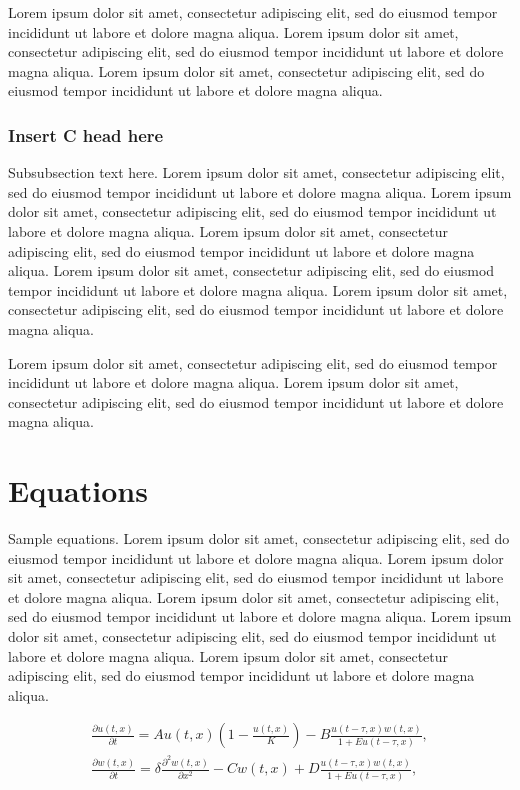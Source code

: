 \documentclass[
  journal=large,
  manuscript=article-type,
  year=2020,
  volume=37,
]{cup-journal}
\begin{document}
 Lorem ipsum dolor sit amet, consectetur adipiscing elit, sed do eiusmod tempor incididunt ut labore et dolore magna aliqua. Lorem ipsum dolor sit amet, consectetur adipiscing elit, sed do eiusmod tempor incididunt ut labore et dolore magna aliqua. Lorem ipsum dolor sit amet, consectetur adipiscing elit, sed do eiusmod tempor incididunt ut labore et dolore magna aliqua. 

\subsubsection{Insert C head here}
Subsubsection text here. Lorem ipsum dolor sit amet, consectetur adipiscing elit, sed do eiusmod tempor incididunt ut labore et dolore magna aliqua. Lorem ipsum dolor sit amet, consectetur adipiscing elit, sed do eiusmod tempor incididunt ut labore et dolore magna aliqua. Lorem ipsum dolor sit amet, consectetur adipiscing elit, sed do eiusmod tempor incididunt ut labore et dolore magna aliqua. Lorem ipsum dolor sit amet, consectetur adipiscing elit, sed do eiusmod tempor incididunt ut labore et dolore magna aliqua. Lorem ipsum dolor sit amet, consectetur adipiscing elit, sed do eiusmod tempor incididunt ut labore et dolore magna aliqua. 

Lorem ipsum dolor sit amet, consectetur adipiscing elit, sed do eiusmod tempor incididunt ut labore et dolore magna aliqua. Lorem ipsum dolor sit amet, consectetur adipiscing elit, sed do eiusmod tempor incididunt ut labore et dolore magna aliqua. 

\section{Equations}

Sample equations. Lorem ipsum dolor sit amet, consectetur adipiscing elit, sed do eiusmod tempor incididunt ut labore et dolore magna aliqua. Lorem ipsum dolor sit amet, consectetur adipiscing elit, sed do eiusmod tempor incididunt ut labore et dolore magna aliqua. Lorem ipsum dolor sit amet, consectetur adipiscing elit, sed do eiusmod tempor incididunt ut labore et dolore magna aliqua. Lorem ipsum dolor sit amet, consectetur adipiscing elit, sed do eiusmod tempor incididunt ut labore et dolore magna aliqua. Lorem ipsum dolor sit amet, consectetur adipiscing elit, sed do eiusmod tempor incididunt ut labore et dolore magna aliqua. 


\begin{equation}
\begin{aligned}\label{eq:first}
\frac{\partial u(t,x)}{\partial t} = Au(t,x) \left(1-\frac{u(t,x)}{K}\right)
 -B\frac{u(t-\tau,x) w(t,x)}{1+Eu(t-\tau,x)},\\
\frac{\partial w(t,x)}{\partial t} =\delta \frac{\partial^2w(t,x)}{\partial x^2}-Cw(t,x)
+D\frac{u(t-\tau,x)w(t,x)}{1+Eu(t-\tau,x)},
\end{aligned}
\end{equation}
\end{document}
